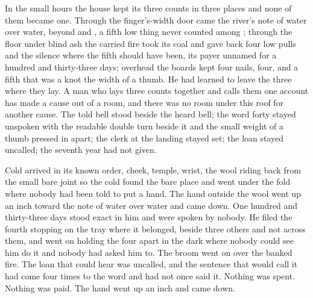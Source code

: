 \scenebreak

In the small hours the house kept its three counts in three places and none of them became one. Through the finger's-width door came the river's note of water over water, beyond  and , a fifth low thing never counted among ; through the floor under blind ash the carried fire took its coal and gave back four low pulls and the silence where the fifth should have been, its payer unnamed for a hundred and thirty-three days; overhead the boards kept four nails, four, and a fifth that was a knot the width of a thumb. He had learned to leave the three where they lay. A man who lays three counts together and calls them one account has made a cause out of a room, and there was no room under this roof for another cause. The told bell stood beside the heard bell; the word forty stayed unspoken with the readable double turn beside it and the small weight of a thumb pressed in apart; the clerk at the landing stayed set; the loan stayed uncalled; the seventh year had not given.

Cold arrived in its known order, cheek, temple, wrist, the wool riding back from the small bare joint so the cold found the bare place and went under the fold where nobody had been told to put a hand. The hand outside the wool went up an inch toward the note of water over water and came down. One hundred and thirty-three days stood exact in him and were spoken by nobody. He filed the fourth stopping on the tray where it belonged, beside three others and not across them, and went on holding the four apart in the dark where nobody could see him do it and nobody had asked him to. The broom went on over the banked fire. The loan that could hear was uncalled, and the sentence that would call it had come four times to the word and had not once said it. Nothing was spent. Nothing was paid. The hand went up an inch and came down.
